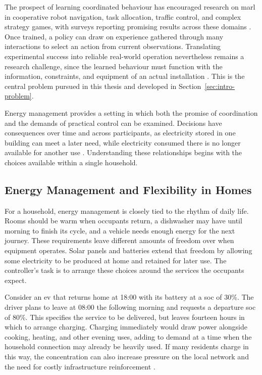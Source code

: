 The prospect of learning coordinated behaviour has encouraged research on \gls{marl} in cooperative robot navigation, task allocation, traffic control, and complex strategy games, with surveys reporting promising results across these domains \parencite{gronauer2022survey,orr2023multirobot}. Once trained, a policy can draw on experience gathered through many interactions to select an action from current observations. Translating experimental success into reliable real-world operation nevertheless remains a research challenge, since the learned behaviour must function with the information, constraints, and equipment of an actual installation \parencite{dulacarnold2021realworld,orr2023multirobot}. This is the central problem pursued in this thesis and developed in Section~\ref{sec:intro-problem}.

Energy management provides a setting in which both the promise of coordination and the demands of practical control can be examined. Decisions have consequences over time and across participants, as electricity stored in one building can meet a later need, while electricity consumed there is no longer available for another use \parencite{keren2024energynetworks}. Understanding these relationships begins with the choices available within a single household.

\subsection{Energy Management and Flexibility in Homes}
\label{sec:intro-energy-flexibility}

For a household, energy management is closely tied to the rhythm of daily life. Rooms should be warm when occupants return, a dishwasher may have until morning to finish its cycle, and a vehicle needs enough energy for the next journey. These requirements leave different amounts of freedom over when equipment operates. Solar panels and batteries extend that freedom by allowing some electricity to be produced at home and retained for later use. The controller's task is to arrange these choices around the services the occupants expect.

Consider an \gls{ev} that returns home at 18:00 with its battery at a \gls{soc} of 30\%. The driver plans to leave at 08:00 the following morning and requests a departure \gls{soc} of 80\%. This specifies the service to be delivered, but leaves fourteen hours in which to arrange charging. Charging immediately would draw power alongside cooking, heating, and other evening uses, adding to demand at a time when the household connection may already be heavily used. If many residents charge in this way, the concentration can also increase pressure on the local network and the need for costly infrastructure reinforcement \parencite{hodge2017charging}.

